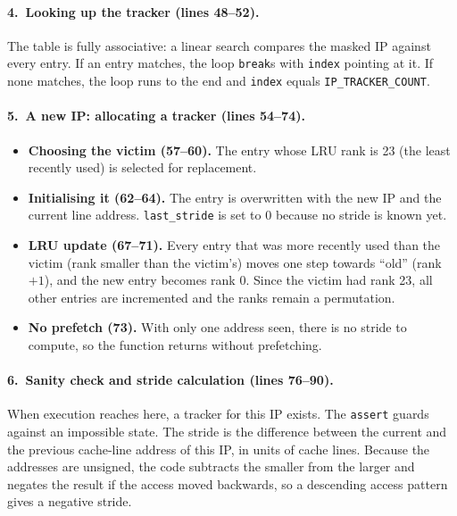 \documentclass[11pt,a4paper]{article}
\begin{document}
\paragraph{4.\ Looking up the tracker (lines 48--52).}

The table is fully associative: a linear search compares the masked IP against every entry.
If an entry matches, the loop \texttt{break}s with \texttt{index} pointing at it. If none
matches, the loop runs to the end and \texttt{index} equals \texttt{IP\_TRACKER\_COUNT}.

\paragraph{5.\ A new IP: allocating a tracker (lines 54--74).}

\begin{itemize}
    \item \textbf{Choosing the victim (57--60).} The entry whose LRU rank is 23 (the least
          recently used) is selected for replacement.
    \item \textbf{Initialising it (62--64).} The entry is overwritten with the new IP and the
          current line address. \texttt{last\_stride} is set to 0 because no stride is known yet.
    \item \textbf{LRU update (67--71).} Every entry that was more recently used than the victim
          (rank smaller than the victim's) moves one step towards ``old'' (rank $+1$), and the new
          entry becomes rank 0. Since the victim had rank 23, all other entries are incremented
          and the ranks remain a permutation.
    \item \textbf{No prefetch (73).} With only one address seen, there is no stride to
          compute, so the function returns without prefetching.
\end{itemize}

\paragraph{6.\ Sanity check and stride calculation (lines 76--90).}

When execution reaches here, a tracker for this IP exists. The \texttt{assert} guards against
an impossible state. The stride is the difference between the current and the previous cache-line
address of this IP, in units of cache lines. Because the addresses are unsigned, the code
subtracts the smaller from the larger and negates the result if the access moved backwards, so a
descending access pattern gives a negative stride.
\end{document}
